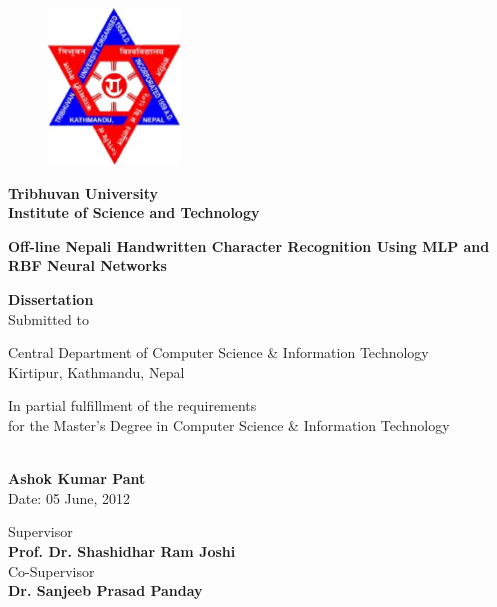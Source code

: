 \pagebreak
\pagestyle{empty}
\begin{figure}[tp] %
\centering
\includegraphics[width=100pt]{title_pages/logo.eps}
\end{figure}
\begin{center}
    \Large\textbf{{Tribhuvan University\\
    Institute of Science and Technology}}   					%

 {\Huge \vspace*{20mm} \textbf{{Off-line Nepali Handwritten Character Recognition Using MLP and RBF Neural Networks}}}\par		%

{ \vspace*{12mm} \textbf{{\Large Dissertation}\\}}
								\large Submitted to\par	%
{\large\vspace*{5mm} Central Department of Computer Science \& Information Technology\\
					Kirtipur, Kathmandu, Nepal }\par
					
{\large\vspace*{10mm} In partial fulfillment of the requirements\\
					for the Master’s Degree in Computer Science \& Information Technology }\par %

{\vspace*{8mm}{By}}\\										%
{\textbf{Ashok Kumar Pant}}							%
\\Date: 05 June, 2012\par
	{\vspace*{8mm}Supervisor}\\
\textbf{Prof. Dr. Shashidhar Ram Joshi}\\					%
{\vspace*{4mm}Co-Supervisor}\\
\textbf{Dr. Sanjeeb Prasad Panday}\\					%
\end{center}
